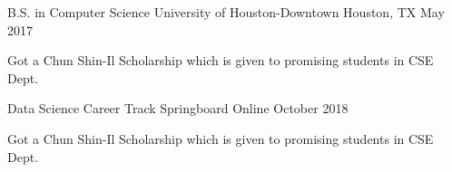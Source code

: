 

\begin{cventries}
	
	\cventryschool
	{B.S. in Computer Science} %
	{University of Houston-Downtown} %
	{Houston, TX} %
	{May 2017} %
	{
		\begin{cvitems} %
			\item {Got a Chun Shin-Il Scholarship which is given to promising students in CSE Dept.}
		\end{cvitems}
	}
	
	
	\cventryschool
	{Data Science Career Track} %
	{Springboard} %
	{Online} %
	{October 2018} %
	{
		\begin{cvitems} %
			\item {Got a Chun Shin-Il Scholarship which is given to promising students in CSE Dept.}
		\end{cvitems}
	}
	\vspace*{-4mm}
\end{cventries}
